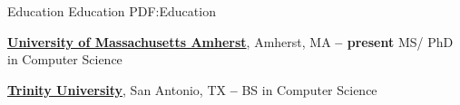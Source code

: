 \Section
{Education}
{Education}
{PDF:Education}

\Entry
\href{https://www.cics.umass.edu/}
{\textbf{University of Massachusetts Amherst}},
Amherst, MA
\dotfill
\textbf{ -- present}
\SubEntry
\Gap
MS/ PhD in Computer Science

\BigGap
\Entry
\href{https://new.trinity.edu/academics/departments/computer-science}
{\textbf{Trinity University}},
San Antonio, TX
\dotfill
\textbf{ -- }
\SubEntry
\Gap
BS in Computer Science
